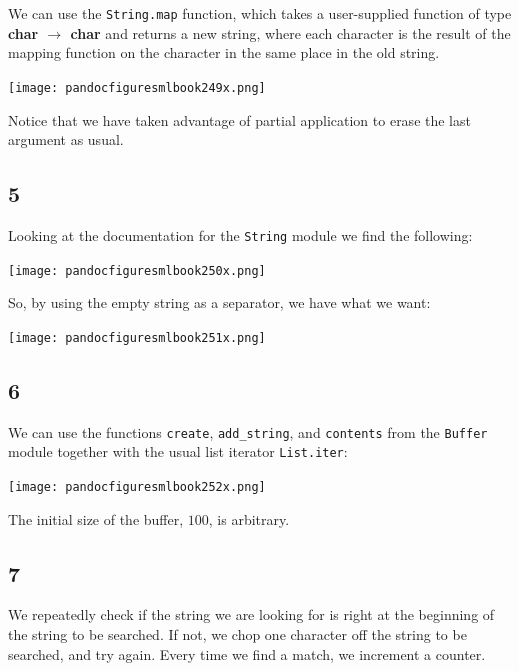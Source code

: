\documentclass[]{book}
\begin{document}
We can use the \texttt{String.map} function, which takes a user-supplied function of type \textsf{\textbf{char $\rightarrow$ char}} and returns a new string, where each character is the result of the mapping function on the character in the same place in the old string.

\medskip
\begin{center}
\noindent\texttt{[image: pandocfiguresmlbook249x.png]}
\end{center}
\medskip

\noindent Notice that we have taken advantage of partial application to erase the last argument as usual.

\subsection*{5}

Looking at the documentation for the \texttt{String} module we find the following:

\medskip
\begin{center}
\noindent\texttt{[image: pandocfiguresmlbook250x.png]}
\end{center}
\medskip

\noindent So, by using the empty string as a separator, we have what we want:

\medskip
\begin{center}
\noindent\texttt{[image: pandocfiguresmlbook251x.png]}
\end{center}
\medskip

\subsection*{6}

We can use the functions \texttt{create}, \texttt{add\_string}, and \texttt{contents} from the \texttt{Buffer} module together with the usual list iterator \texttt{List.iter}:

\medskip
\begin{center}
\noindent\texttt{[image: pandocfiguresmlbook252x.png]}
\end{center}
\medskip

\noindent The initial size of the buffer, $100$, is arbitrary.

\subsection*{7}

We repeatedly check if the string we are looking for is right at the beginning of the string to be searched. If not, we chop one character off the string to be searched, and try again. Every time we find a match, we increment a counter.
\end{document}
